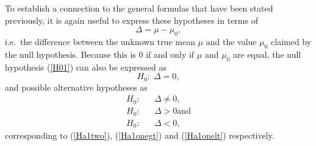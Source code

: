 To establish a connection to the general formulas that have been stated
previously, it is again useful to express these hypotheses in terms of
\begin{equation}
\Delta=\mu-\mu_{0},
\label{D1mu}
\end{equation}
i.e.\ the difference between the unknown true mean $\mu$ and
the value $\mu_{0}$ claimed by the null hypothesis. Because
this is 0 if and only if $\mu$ and
$\mu_{0}$ are equal, the null hypothesis (\ref{H01}) can also
be expressed as
\begin{equation}
H_{0}: \; \Delta=0,
\label{H0D}
\end{equation}
and possible alternative hypotheses as
\begin{eqnarray}
H_{0}: && \Delta\ne 0,  \label{HaDtwo}\\
H_{0}: && \Delta> 0 \text{and}  \label{HaDonegt}\\
H_{0}: && \Delta< 0,   \label{HaDonelt}
\end{eqnarray}
corresponding to (\ref{Ha1two}), (\ref{Ha1onegt}) and (\ref{Ha1onelt})
respectively.

